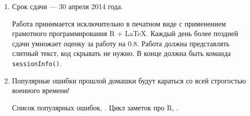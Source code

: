\documentclass[a4paper]{article}
\begin{document}
\begin{enumerate}
\item Срок сдачи --- 30 апреля 2014 года. 

Работа принимается исключительно в печатном виде с применением грамотного программирования R + \LaTeX. Каждый день более поздней сдачи умножает оценку за работу на $0.8$.  Работа должна представлять слитный текст, код скрывать не нужно. В конце должна быть команда \verb|sessionInfo()|.

\item Популярные ошибки прошлой домашки будут караться со всей строгостью военного времени! 

Список популярных ошибок, \url{}. Цикл заметок про R, \url{}.
 
\end{enumerate}
\end{document}
